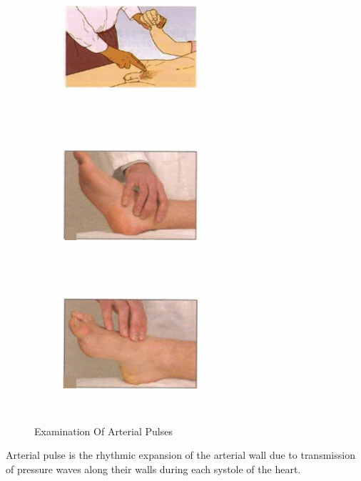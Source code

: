 \documentclass[a4paper,12pt]{book}
\begin{document}
{\begin{figure}[H]
\begin{subfigure}[t]{.29\textwidth}
			\label{collapsingPulse}
		\end{subfigure}
		\begin{subfigure}[t]{.29\textwidth}
			\includegraphics[height=5cm, width=5cm]{./clinicalPhysioPic/radioFemoralDelay.jpg}
			\label{radioFemoralDelay}
		\end{subfigure}
		\hspace{\fill}
		\begin{subfigure}[t]{.29\textwidth}
			\includegraphics[height=5cm, width=5cm]{./clinicalPhysioPic/posteriorTibial.jpg}
			\label{posteriorTibial}
		\end{subfigure}
		\hspace{\fill}
		\begin{subfigure}[t]{.29\textwidth}
			\includegraphics[height=5cm,width=5cm]{./clinicalPhysioPic/dorsalisPedis.jpg}
			\label{dorsalisPedis}
		\end{subfigure}
		
		\caption*{Examination Of Arterial Pulses}
		\label{arterialPulses}
	\end{figure}
	}
Arterial pulse is the rhythmic expansion of the arterial wall due to transmission of pressure waves along their walls during each systole of the heart.
\end{document}

